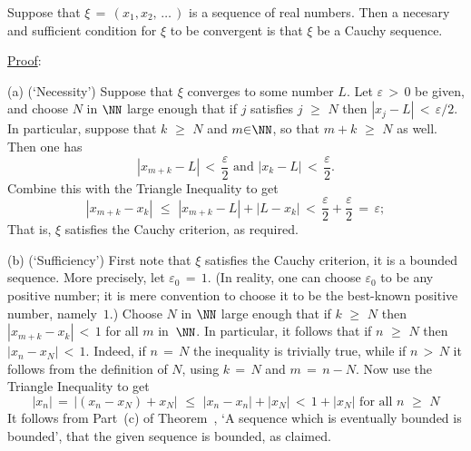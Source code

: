         Suppose that ${\xi} \,=\, (x_{1},x_{2},\,{\ldots}\,)$ is a sequence of real numbers.
    Then a necesary and sufficient condition for ${\xi}$ to be convergent is that ${\xi}$ be a Cauchy sequence.

\V

        \underline{Proof}:

\V

        (a) (`Necessity') Suppose that ${\xi}$ converges to some number $L$.
    Let ${\varepsilon}\,>\,0$ be given, and choose $N$ in ${\NN}$ large enough that if $j$ satisfies $j\,\,{\geq}\,\,N$ then $|x_{j}-L|\,<\,{\varepsilon}/2$.
    In particular, suppose that $k\,\,{\geq}\,\,N$ and $m{\in}{\NN}$, so that $m+k\,\,{\geq}\,\,N$ as well. Then one has
        \begin{displaymath}
        |x_{m+k}-L|\,<\,\frac{{\varepsilon}}{2} \mbox{ and } |x_{k}-L|\,<\,\frac{{\varepsilon}}{2}.
        \end{displaymath}
    Combine this with the Triangle Inequality to get
        \begin{displaymath}
        |x_{m+k}-x_{k}|\,\,{\leq}\,\,|x_{m+k}-L| + |L-x_{k}|\,<\,\frac{{\varepsilon}}{2} + \frac{{\varepsilon}}{2} \,=\, {\varepsilon};
        \end{displaymath}
    That is, ${\xi}$ satisfies the Cauchy criterion, as required.

\V

        (b) (`Sufficiency') First note that ${\xi}$ satisfies the Cauchy criterion, it is a bounded sequence.
    More precisely, let ${\varepsilon}_{0} \,=\, 1$. (In reality, one can choose 
${\varepsilon}_{0}$ to be any positive number;
    it is mere convention to choose it to be the best-known positive number, namely~$1$.)
    Choose $N$ in ${\NN}$ large enough that if $k\,\,{\geq}\,\,N$ then $|x_{m+k} - x_{k}|\,<\,1$ for all $m$ in~${\NN}$.
    In particular, it follows that if $n\,\,{\geq}\,\,N$ then $|x_{n} - x_{N}|\,<\,1$.
    Indeed, if $n \,=\, N$ the inequality is trivially true, while if $n\,>\,N$ it follows from the definition of $N$, using $k \,=\, N$ and $m \,=\, n-N$.
    Now use the Triangle Inequality to get
        \begin{displaymath}
        |x_{n}| \,=\, |(x_{n} - x_{N}) + x_{N}|\,\,{\leq}\,\,|x_{n}-x_{n}| + |x_{N}|\,<\,1+|x_{N}| \mbox{ for all $n\,\,{\geq}\,\,N$}
        \end{displaymath}
    It follows from Part~(c) of Theorem~, `A sequence which is eventually bounded is bounded',
    that the given sequence is bounded, as claimed.

